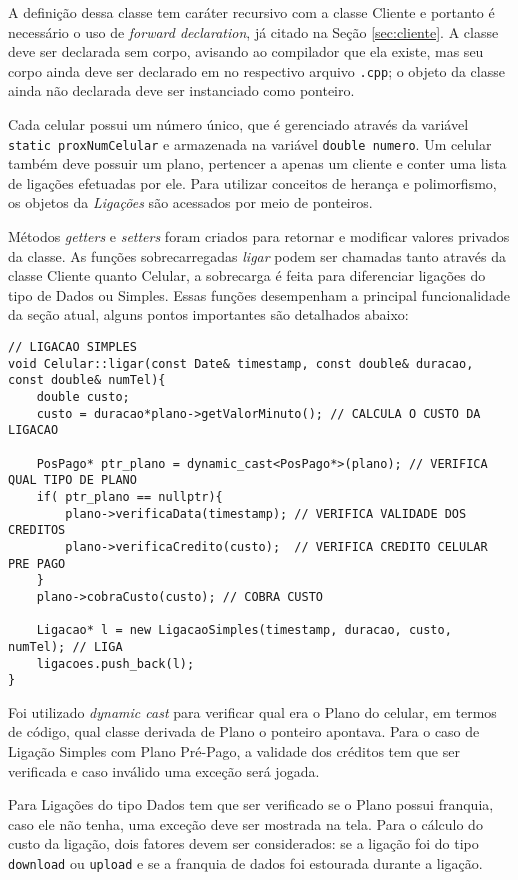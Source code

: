 A definição dessa classe tem caráter recursivo com a classe Cliente e portanto é necessário o uso de \textit{forward declaration}, já citado na Seção \ref{sec:cliente}. A classe deve ser declarada sem corpo, avisando ao compilador que ela existe, mas seu corpo ainda deve ser declarado em no respectivo arquivo \texttt{.cpp}; o objeto da classe ainda não declarada deve ser instanciado como ponteiro.

Cada celular possui um número único, que é gerenciado através da variável \texttt{static proxNumCelular} e armazenada na variável \texttt{double numero}. Um celular também deve possuir um plano, pertencer a apenas um cliente e conter uma lista de ligações efetuadas por ele. Para utilizar conceitos de herança e polimorfismo, os objetos da \textit{Ligações} são acessados por meio de ponteiros. 

Métodos \textit{getters} e \textit{setters} foram criados para retornar e modificar valores privados da classe. As funções sobrecarregadas \textit{ligar} podem ser chamadas tanto através da classe Cliente quanto Celular, a sobrecarga é feita para diferenciar ligações do tipo de Dados ou Simples. Essas funções desempenham a principal funcionalidade da seção atual, alguns pontos importantes são detalhados abaixo:

\begin{lstlisting}[basicstyle=\tiny]
// LIGACAO SIMPLES
void Celular::ligar(const Date& timestamp, const double& duracao, const double& numTel){
	double custo;
	custo = duracao*plano->getValorMinuto(); // CALCULA O CUSTO DA LIGACAO
	
	PosPago* ptr_plano = dynamic_cast<PosPago*>(plano); // VERIFICA QUAL TIPO DE PLANO
	if( ptr_plano == nullptr){ 
		plano->verificaData(timestamp); // VERIFICA VALIDADE DOS CREDITOS
		plano->verificaCredito(custo);  // VERIFICA CREDITO CELULAR PRE PAGO
	}
	plano->cobraCusto(custo); // COBRA CUSTO
	
	Ligacao* l = new LigacaoSimples(timestamp, duracao, custo, numTel); // LIGA
	ligacoes.push_back(l);
}
\end{lstlisting}

Foi utilizado \textit{dynamic cast} para verificar qual era o Plano do celular, em termos de código, qual classe derivada de Plano o ponteiro apontava. Para o caso de Ligação Simples com Plano Pré-Pago, a validade dos créditos tem que ser verificada e caso inválido uma exceção será jogada.

Para Ligações do tipo Dados tem que ser verificado se o Plano possui franquia, caso ele não tenha, uma exceção deve ser mostrada na tela. Para o cálculo do custo da ligação, dois fatores devem ser considerados: se a ligação foi do tipo \texttt{download} ou \texttt{upload} e se a franquia de dados foi estourada durante a ligação. 

